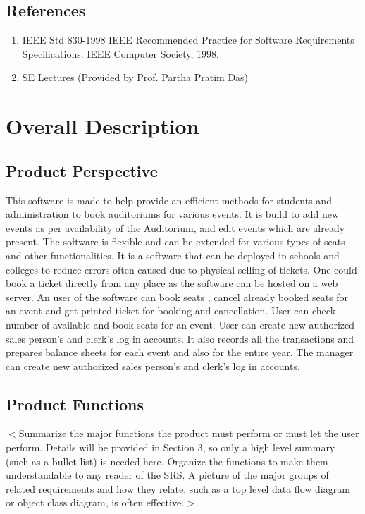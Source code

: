 \documentclass{scrreprt}
\begin{document}
\section{References}
\begin{enumerate}
	\item IEEE Std 830-1998 IEEE Recommended Practice for Software Requirements Specifications. IEEE Computer Society, 1998.
	\item SE Lectures (Provided by Prof. Partha Pratim Das)
\end{enumerate}


\chapter{Overall Description}

\section{Product Perspective}
This software is made to help provide an efficient methods for students and administration to book auditoriums for various events. It is build to add new events as per availability of the Auditorium, and edit events which are already present. The software is flexible and can be extended for various types of seats and other functionalities. It is a software that can be deployed in schools and colleges to reduce errors often caused due to physical selling of tickets. One could book a ticket directly from any place as the software can be hosted on a web server. An user of the software can book seats , cancel already booked seats for an event and get printed ticket for booking and cancellation. User can check number of available and book seats for an event. User can create new authorized sales person’s and clerk’s log in accounts. It also records all the transactions and prepares balance sheets for each event and also for the entire year. The manager can create new authorized sales person’s and clerk’s log in accounts.


\section{Product Functions}
$<$Summarize the major functions the product must perform or must let the user 
perform. Details will be provided in Section 3, so only a high level summary 
(such as a bullet list) is needed here. Organize the functions to make them 
understandable to any reader of the SRS. A picture of the major groups of 
related requirements and how they relate, such as a top level data flow diagram 
or object class diagram, is often effective.$>$
\end{document}
